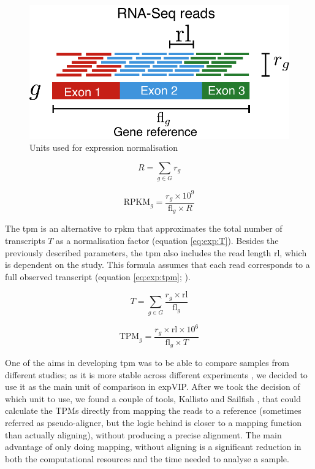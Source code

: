 \begin{figure}
\includegraphics[width=1\textwidth]{expVIP/Figures/Units.pdf}
\caption[Units used for expression normalisation]{Units used for expression normalisation}
\label{fig:exp:units}
\end{figure} 


\begin{equation}
\label{eq:exp:R}
R = \displaystyle\sum_{g \in G} r_{g} 
\end{equation}

\begin{equation}
\label{eq:exp:rpkm}
  \textrm{RPKM}_{g} = \frac{r_{g}\times10^9}{\textrm{fl}_{g}\times R}
\end{equation}

The \gls{tpm} is an alternative to \gls{rpkm} that approximates the total number of transcripts $T$ as a normalisation factor (equation \ref{eq:exp:T}). 
Besides the previously described parameters, the \acrshort{tpm} also includes the read length $\textrm{rl}$, which is dependent on the study. 
This formula assumes that each read corresponds to a full observed transcript (equation \ref{eq:exp:tpm}; \citealt{Wagner2012}). 

\begin{equation}
\label{eq:exp:T}
T = \displaystyle\sum_{g \in G} \frac{r_{g} \times \textrm{rl}}{\textrm{fl}_{g}}
\end{equation}

\begin{equation}
\label{eq:exp:tpm}
  \textrm{TPM}_{g} = \frac{r_{g} \times \textrm{rl}\times10^6}{\textrm{fl}_{g} \times T }
\end{equation}


One of the aims in developing \gls{tpm} was to be able to compare samples from different studies; as it is more stable across different experiments \citep{Wagner2012}, we decided to use it as the main unit of comparison in expVIP. 
After we took the decision of which unit to use, we found a couple of tools, Kallisto \citep{Bray2016} and Sailfish \citep{Patro2014}, that could calculate the TPMs directly from mapping the reads to a reference (sometimes referred as pseudo-aligner, but the logic behind is closer to a mapping function than actually aligning), without producing a precise alignment.
The main advantage of only doing mapping, without aligning is a significant reduction in both the computational resources and the time needed to analyse a sample.

